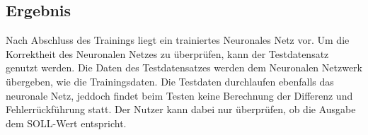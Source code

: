 \subsection{Ergebnis}
\label{sec:ergebnis}
Nach Abschluss des Trainings liegt ein trainiertes Neuronales Netz vor. Um die Korrektheit des Neuronalen Netzes zu überprüfen, kann der Testdatensatz genutzt werden. Die Daten des Testdatensatzes werden dem Neuronalen Netzwerk übergeben, wie die Trainingsdaten. Die Testdaten durchlaufen ebenfalls das neuronale Netz, jeddoch findet beim Testen keine Berechnung der Differenz und Fehlerrückführung statt. Der Nutzer kann dabei nur überprüfen, ob die Ausgabe dem SOLL-Wert entspricht. 

